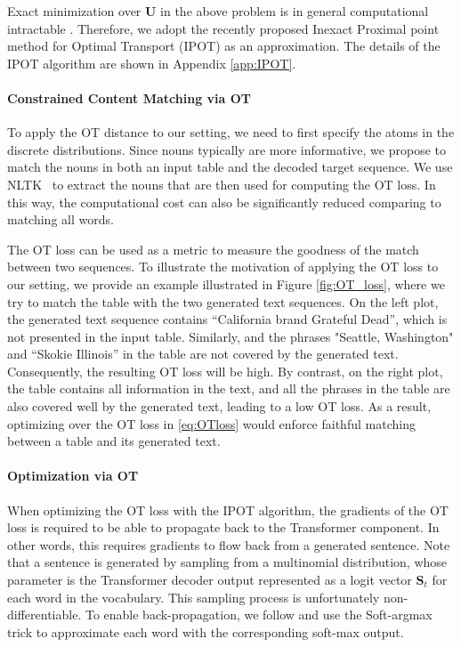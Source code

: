 \documentclass[11pt,a4paper]{article}
\begin{document}
Exact minimization over $\bm{U}$ in the above problem is in general computational
intractable \cite{Genevay2018}. Therefore, we adopt the recently proposed Inexact Proximal point method for Optimal Transport (IPOT) \cite{yujia2018} as an approximation. The details of the IPOT algorithm are shown in Appendix \ref{app:IPOT}.

\paragraph{Constrained Content Matching via OT}
To apply the OT distance to our setting, we need to first specify the atoms in the discrete distributions. Since nouns typically are more informative, we propose to match the nouns in both an input table and the decoded target sequence. We use NLTK~\cite{loper2002} to extract the nouns that are then used for computing the OT loss. In this way, the computational cost can also be significantly reduced comparing to matching all words. 

The OT loss can be used as a metric to measure the goodness of the match between two sequences. To illustrate the motivation of applying the OT loss to our setting, we provide an example illustrated in Figure \ref{fig:OT_loss}, where we try to match the table with the two generated text sequences. On the left plot, the generated text sequence contains ``California brand Grateful Dead'', which is not presented in the input table. Similarly, and the phrases "Seattle, Washington" and ``Skokie Illinois'' in the table are not covered by the generated text. Consequently, the resulting OT loss will be high. By contrast, on the right plot, the table contains all information in the text, and all the phrases in the table are also covered well by the generated text, leading to a low OT loss. As a result, optimizing over the OT loss in \eqref{eq:OTloss} would enforce faithful matching between a table and its generated text.


\paragraph{Optimization via OT}
When optimizing the OT loss with the IPOT algorithm, the gradients of the OT loss is required to be able to propagate back to the Transformer component. In other words, this requires gradients to flow back from a generated sentence. Note that a sentence is generated by sampling from a multinomial distribution, whose parameter is the Transformer decoder output represented as a logit vector $\bm{S}_t$ for each word in the vocabulary. This sampling process is unfortunately non-differentiable. To enable back-propagation, we follow \citet{liqun2019} and use the Soft-argmax trick to approximate each word with the corresponding soft-max output.
\end{document}
